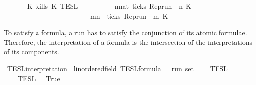 \begin{isabellebody}
\ \ %
\isanewline
\ \ {\isacharbar}\ {\isacartoucheopen}{\isasymlbrakk}\ K\ kills\ K\ {\isasymrbrakk}\isactrlsub T\isactrlsub E\isactrlsub S\isactrlsub L\ {\isacharequal}\isanewline
\ \ \ \ \ \ \ \ {\isacharbraceleft}{\isasymrho}{\isachardot}\ {\isasymforall}n{\isacharcolon}{\isacharcolon}nat{\isachardot}\ ticks\ {\isacharparenleft}{\isacharparenleft}Rep{\isacharunderscore}run\ {\isasymrho}{\isacharparenright}\ n\ K\isanewline
\ \ \ \ \ \ \ \ \ \ \ \ \ \ \ \ \ \ \ \ \ \ \ \ {\isasymlongrightarrow}\ {\isacharparenleft}{\isasymforall}m{\isasymge}n{\isachardot}\ {\isasymnot}\ ticks\ {\isacharparenleft}{\isacharparenleft}Rep{\isacharunderscore}run\ {\isasymrho}{\isacharparenright}\ m\ K%
\isadelimdocument
%
\endisadelimdocument
%
\isatagdocument
%
\isamarkuptrue%
%
\endisatagdocument
{\isafolddocument}%
%
\isadelimdocument
%
\endisadelimdocument
%
\begin{isamarkuptext}%
To satisfy a formula, a run has to satisfy the conjunction of its atomic 
  formulae. Therefore, the interpretation of a formula is the intersection
  of the interpretations of its components.%
\end{isamarkuptext}\isamarkuptrue%
\isamarkupfalse%
\ TESL{\isacharunderscore}interpretation\ {\isacharcolon}{\isacharcolon}\ {\isacartoucheopen}{\isacharparenleft}{\isacharprime}{\isasymtau}{\isacharcolon}{\isacharcolon}linordered{\isacharunderscore}field{\isacharparenright}\ TESL{\isacharunderscore}formula\ {\isasymRightarrow}\ {\isacharprime}{\isasymtau}\ run\ set{\isacartoucheclose}\isanewline
\ \ {\isacharparenleft}{\isacartoucheopen}{\isasymlbrakk}{\isasymlbrakk}\ {\isacharunderscore}\ {\isasymrbrakk}{\isasymrbrakk}\isactrlsub T\isactrlsub E\isactrlsub S\isactrlsub L{\isacartoucheclose}{\isacharparenright}\isanewline
{}\isanewline
\ \ {\isacartoucheopen}{\isasymlbrakk}{\isasymlbrakk}\ {\isacharbrackleft}{\isacharbrackright}\ {\isasymrbrakk}{\isasymrbrakk}\isactrlsub T\isactrlsub E\isactrlsub S\isactrlsub L\ {\isacharequal}\ {\isacharbraceleft}{\isacharunderscore}{\isachardot}\ True{\isacharbraceright}{\isacartoucheclose}\isanewline

\end{isabellebody}
